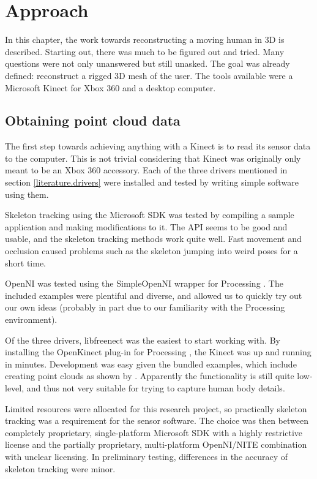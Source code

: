 \chapter{Approach} \label{approach}

In this chapter, the work towards reconstructing a moving human in 3D is described. Starting out, there was much to be figured out and tried. Many questions were not only unanswered but still unasked. The goal was already defined: reconstruct a rigged 3D mesh of the user. The tools available were a Microsoft Kinect for Xbox 360 and a desktop computer.

\section{Obtaining point cloud data}

The first step towards achieving anything with a Kinect is to read its sensor data to the computer. This is not trivial considering that Kinect was originally only meant to be an Xbox 360 accessory. Each of the three drivers mentioned in section \ref{literature.drivers} were installed and tested by writing simple software using them.

Skeleton tracking using the Microsoft SDK was tested by compiling a sample application and making modifications to it. The API seems to be good and usable, and the skeleton tracking methods work quite well. Fast movement and occlusion caused problems such as the skeleton jumping into weird poses for a short time.

OpenNI was tested using the SimpleOpenNI \citep{simpleopenni} wrapper for Processing \citep{processing}. The included examples were plentiful and diverse, and allowed us to quickly try out our own ideas (probably in part due to our familiarity with the Processing environment).

Of the three drivers, libfreenect was the easiest to start working with. By installing the OpenKinect plug-in for Processing \citep{shiffman2010} \citep{processing}, the Kinect was up and running in minutes. Development was easy given the bundled examples, which include creating point clouds as shown by \citet{fisher2010}. Apparently the functionality is still quite low-level, and thus not very suitable for trying to capture human body details.

Limited resources were allocated for this research project, so practically skeleton tracking was a requirement for the sensor software. The choice was then between completely proprietary, single-platform Microsoft SDK with a highly restrictive license and the partially proprietary, multi-platform OpenNI/NITE combination with unclear licensing. In preliminary testing, differences in the accuracy of skeleton tracking were minor.

